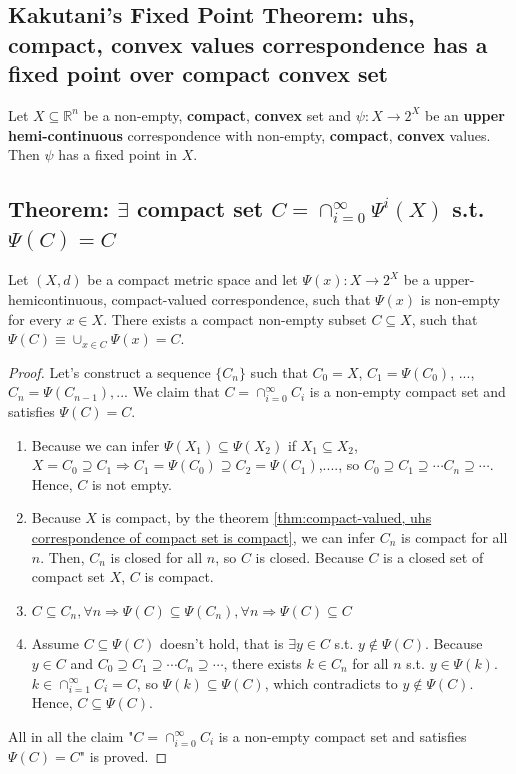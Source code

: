 \documentclass[11pt]{elegantbook}
\begin{document}
\subsection{Kakutani's Fixed Point Theorem: uhs, compact, convex values correspondence has a fixed point over compact convex set}
\begin{theorem}
    Let $X \subseteq \mathbb{R}^n$ be a non-empty, \textbf{compact}, \textbf{convex} set and $\psi : X \rightarrow 2^X$ be an \textbf{upper hemi-continuous} correspondence with non-empty, \textbf{compact}, \textbf{convex} values. Then $\psi$ has a fixed point in $X$.
\end{theorem}


\subsection{Theorem: $\exists$ compact set $C = \cap_{i=0}^\infty \Psi^i(X)$ s.t. $\Psi(C)=C$}
\begin{theorem}
    Let $(X, d)$ be a compact metric space and let $\Psi(x) : X \rightarrow 2^X$ be a upper-hemicontinuous, compact-valued correspondence, such that $\Psi(x)$ is non-empty for every $x \in X$. There exists a compact non-empty subset $C\subseteq X$, such that $\Psi(C) \equiv \cup_{x\in C}\Psi(x) = C$.
\end{theorem}
\begin{proof}
    Let's construct a sequence $\{C_n\}$ such that $C_0=X$, $C_1=\Psi(C_0)$, ..., $C_n=\Psi(C_{n-1}),...$ We claim that $C=\cap_{i=0}^\infty C_i$ is a non-empty compact set and satisfies $\Psi(C)=C$.
    \begin{enumerate}
        \item Because we can infer $\Psi(X_1)\subseteq \Psi(X_2)$ if $X_1\subseteq X_2$, $X=C_0\supseteq C_1 \Rightarrow C_1=\Psi(C_0)\supseteq C_2=\Psi(C_1)$,...., so $C_0\supseteq C_1\supseteq \cdots C_n\supseteq \cdots$. Hence, $C$ is not empty.
        \item Because $X$ is compact, by the theorem \ref{thm:compact-valued, uhs correspondence of compact set is compact}, we can infer $C_n$ is compact for all $n$. Then, $C_n$ is closed for all $n$, so $C$ is closed. Because $C$ is a closed set of compact set $X$, $C$ is compact.
        \item $C\subseteq C_n,\forall n \Rightarrow \Psi(C)\subseteq \Psi(C_n),\forall n \Rightarrow \Psi(C)\subseteq C$
        \item Assume $C\subseteq \Psi(C)$ doesn't hold, that is $\exists y\in C$ s.t. $y\notin \Psi(C)$. Because $y\in C$ and $C_0\supseteq C_1\supseteq \cdots C_n\supseteq \cdots$, there exists $k\in C_n$ for all $n$ s.t. $y\in\Psi(k)$. $k\in \cap_{i=1}^\infty C_i=C$, so $\Psi(k)\subseteq \Psi(C)$, which contradicts to $y\notin \Psi(C)$. Hence, $C\subseteq \Psi(C)$.
    \end{enumerate}
    All in all the claim "$C=\cap_{i=0}^\infty C_i$ is a non-empty compact set and satisfies $\Psi(C)=C$" is proved.
\end{proof}
\end{document}
